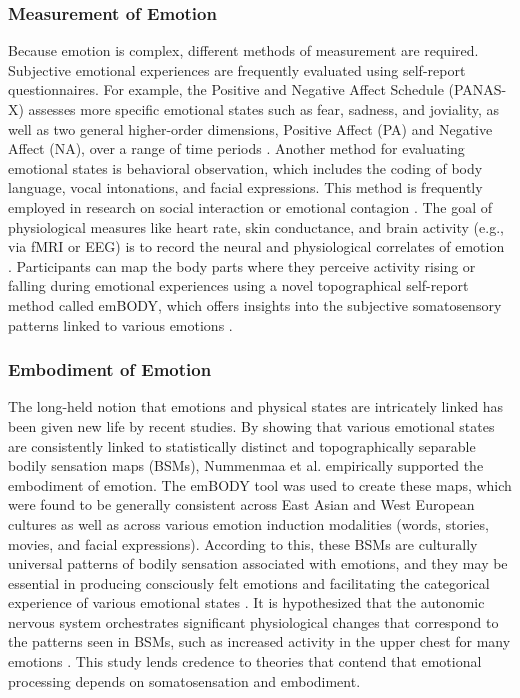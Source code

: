 \documentclass{DESSThesis}
\begin{document}
\subsubsection{Measurement of Emotion}
Because emotion is complex, different methods of measurement are required. Subjective emotional experiences are frequently evaluated using self-report questionnaires. For example, the Positive and Negative Affect Schedule (PANAS-X) assesses more specific emotional states such as fear, sadness, and joviality, as well as two general higher-order dimensions, Positive Affect (PA) and Negative Affect (NA), over a range of time periods \cite{david_watson_panas-x_1994}. Another method for evaluating emotional states is behavioral observation, which includes the coding of body language, vocal intonations, and facial expressions. This method is frequently employed in research on social interaction or emotional contagion \cite{barsade_ripple_2002,nummenmaa_bodily_2014}. The goal of physiological measures like heart rate, skin conductance, and brain activity (e.g., via fMRI or EEG) is to record the neural and physiological correlates of emotion \cite{nummenmaa_bodily_2014,paul_towards_2020}. Participants can map the body parts where they perceive activity rising or falling during emotional experiences using a novel topographical self-report method called emBODY, which offers insights into the subjective somatosensory patterns linked to various emotions \cite{nummenmaa_bodily_2014}.

\subsubsection{Embodiment of Emotion}
The long-held notion that emotions and physical states are intricately linked has been given new life by recent studies. By showing that various emotional states are consistently linked to statistically distinct and topographically separable bodily sensation maps (BSMs), Nummenmaa et al. empirically supported the embodiment of emotion. The emBODY tool was used to create these maps, which were found to be generally consistent across East Asian and West European cultures as well as across various emotion induction modalities (words, stories, movies, and facial expressions). According to this, these BSMs are culturally universal patterns of bodily sensation associated with emotions, and they may be essential in producing consciously felt emotions and facilitating the categorical experience of various emotional states \cite{nummenmaa_bodily_2014}. It is hypothesized that the autonomic nervous system orchestrates significant physiological changes that correspond to the patterns seen in BSMs, such as increased activity in the upper chest for many emotions \cite{nummenmaa_bodily_2014}. This study lends credence to theories that contend that emotional processing depends on somatosensation and embodiment.
\end{document}
